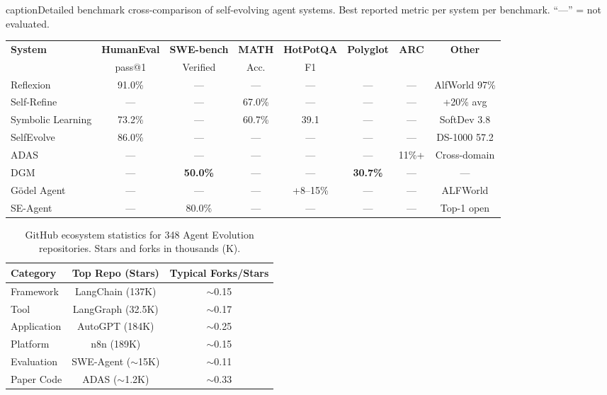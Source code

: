 \begin{table}[t]
\centering
caption{Detailed benchmark cross-comparison of self-evolving agent systems. Best reported metric per system per benchmark. ``---'' = not evaluated.}
\label{tab:bench-agent-detail}
\begin{tabular}{@{}lccccccc@{}}
\toprule
\textbf{System} & \textbf{HumanEval} & \textbf{SWE-bench} & \textbf{MATH} & \textbf{HotPotQA} & \textbf{Polyglot} & \textbf{ARC} & \textbf{Other} \\
 & pass@1 & Verified & Acc. & F1 & & & \\
\midrule
Reflexion & 91.0\% & --- & --- & --- & --- & --- & AlfWorld 97\% \\
Self-Refine & --- & --- & 67.0\% & --- & --- & --- & +20\% avg \\
Symbolic Learning & 73.2\% & --- & 60.7\% & 39.1 & --- & --- & SoftDev 3.8 \\
SelfEvolve & 86.0\% & --- & --- & --- & --- & --- & DS-1000 57.2 \\
ADAS & --- & --- & --- & --- & --- & 11\%+ & Cross-domain \\
DGM & --- & \textbf{50.0\%} & --- & --- & \textbf{30.7\%} & --- & --- \\
G\"odel Agent & --- & --- & --- & +8--15\% & --- & --- & ALFWorld \\
SE-Agent & --- & 80.0\% & --- & --- & --- & --- & Top-1 open \\
\bottomrule
\end{tabular}
\end{table}

\begin{table}[t]
\centering
\caption{GitHub ecosystem statistics for 348 Agent Evolution repositories. Stars and forks in thousands (K).}
\label{tab:bench-github}
\begin{tabular}{@{}lcc@{}}
\toprule
\textbf{Category} & \textbf{Top Repo (Stars)} & \textbf{Typical Forks/Stars} \\
\midrule
Framework & LangChain (137K) & $\sim$0.15 \\
Tool & LangGraph (32.5K) & $\sim$0.17 \\
Application & AutoGPT (184K) & $\sim$0.25 \\
Platform & n8n (189K) & $\sim$0.15 \\
Evaluation & SWE-Agent ($\sim$15K) & $\sim$0.11 \\
Paper Code & ADAS ($\sim$1.2K) & $\sim$0.33 \\
\bottomrule
\end{tabular}
\end{table}


